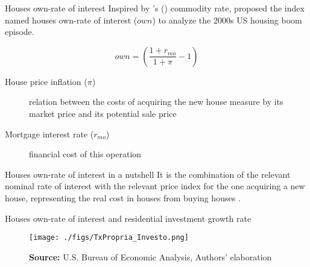 \documentclass[10pt]{beamer}
\begin{document}
\begin{frame}[label={sec:orga850655}]{Houses own-rate of interest}
Inspired by \citeauthor*{sraffaDrHayekMoney1932}'s (\citeyear{sraffaDrHayekMoney1932}) commodity rate, \textcite{teixeira_crescimento_2015}  proposed the index named houses own-rate of interest (\(own\)) to analyze the 2000s US housing boom episode.

\begin{latex}
\begin{equation}
\label{txpropria}
own =  \left(\frac{1+r_{mo}}{1+\pi} - 1\right)
\end{equation}
\end{latex}

\begin{description}
\item[{House price inflation (\(\pi\))}] relation between the costs of acquiring the new house measure by its market price and its potential sale price
\item[{Mortgage interest rate (\(r_{mo}\))}] financial cost of this operation
\end{description}

\begin{block}{Houses own-rate of interest in a nutshell}
It is the combination of the relevant nominal rate of interest with the relevant price index for the one acquiring a new house, representing the \alert{real cost in houses from buying houses} \parencite[p.~53]{teixeira_crescimento_2015}.
\end{block}
\end{frame}


\begin{frame}[label={sec:org281f4f1}]{Houses own-rate of interest and residential investment growth rate}
\begin{figure}[htb]
	\centering
	\texttt{[image: ./figs/TxPropria\_Investo.png]}
	\caption*{\textbf{Source:} U.S. Bureau of Economic Analysis, Authors' elaboration}
\end{figure}
\end{frame}
\end{document}
